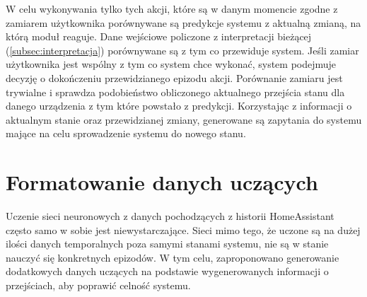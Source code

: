 W celu wykonywania tylko tych akcji, które są w danym momencie zgodne z zamiarem użytkownika porównywane są predykcje systemu z aktualną zmianą, na którą moduł reaguje. Dane wejściowe policzone z interpretacji bieżącej (\ref{subsec:interpretacja}) porównywane są z tym co przewiduje system. Jeśli zamiar użytkownika jest wspólny z tym co system chce wykonać, system podejmuje decyzję o dokończeniu przewidzianego epizodu akcji. Porównanie zamiaru jest trywialne i sprawdza podobieństwo obliczonego aktualnego przejścia stanu dla danego urządzenia z tym które powstało z predykcji. Korzystając z informacji o aktualnym stanie oraz przewidzianej zmiany, generowane są zapytania do systemu mające na celu sprowadzenie systemu do nowego stanu.

\section{Formatowanie danych uczących} \label{sec:dane_uczace}
Uczenie sieci neuronowych z danych pochodzących z historii HomeAssistant często samo w sobie jest niewystarczające. Sieci mimo tego, że uczone są na dużej ilości danych temporalnych poza samymi stanami systemu, nie są w stanie nauczyć się konkretnych epizodów. W tym celu, zaproponowano generowanie dodatkowych danych uczących na podstawie wygenerowanych informacji o przejściach, aby poprawić celność systemu.

